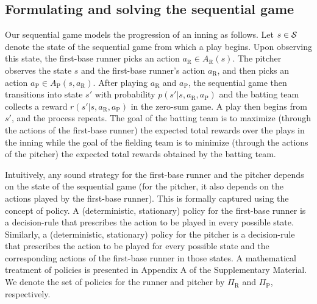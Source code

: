 \documentclass[aoas]{imsart}
\begin{document}
    \subsection{Formulating and solving the sequential game}
    \label{sec:sequential_game_Setup}
    Our sequential game models the progression of an inning as follows. Let $s \in {\cal S}$ denote the state of the sequential game from which a play begins. Upon observing this state, the first-base runner picks an action $a_\text{R} \in A_\text{R}(s)$. The pitcher observes the state $s$ and the first-base runner's action $a_\text{R}$, and then picks an action $a_\text{P} \in A_\text{P}(s,a_\text{R})$. After playing $a_\text{R}$ and $a_\text{P}$, the sequential game then transitions into state $s'$ with probability $p(s'|s,a_\text{R},a_\text{P})$ and the batting team collects a reward $r(s'|s,a_\text{R},a_\text{P})$ in the zero-sum game. A play then begins from $s'$, and the process repeats. The goal of the batting team is to maximize (through the actions of the first-base runner) the expected total rewards over the plays in the inning while the goal of the fielding team is to minimize (through the actions of the pitcher) the expected total rewards obtained by the batting team.

    Intuitively, any sound strategy for the first-base runner and the pitcher depends on the state of the sequential game (for the pitcher, it also depends on the actions played by the first-base runner). This is formally captured using the concept of policy. A (deterministic, stationary) policy for the first-base runner is a decision-rule that prescribes the action to be played in every possible state. Similarly, a (deterministic, stationary) policy for the pitcher is a decision-rule that prescribes the action to be played for every possible state and the corresponding actions of the first-base runner in those states. A mathematical treatment of policies is presented in Appendix A of the Supplementary Material. We denote the set of policies for the runner and pitcher by $\Pi_\text{R}$ and $\Pi_\text{P}$, respectively.
\end{document}
